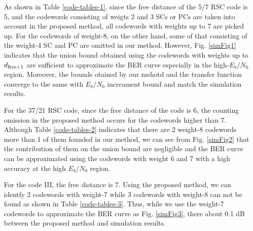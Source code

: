 As shown in Table \ref{code-tables-1}, since the free distance of the 5/7 RSC code is 5, and the codewords consisting of weigts 2 and 3 SCs or PCs are taken into account in the proposed method, all codewords with weights up to 7 are picked up. For the codewords of weight-8, on the other hand, some of that consisting of the weight-4 SC and PC are omitted in our method. However, Fig. \ref{simFig1} indicates that the union bound obtained using the codewords with weights up to $d_{\rm free+1}$ are sufficient to approximate the BER curve especially in the high-$E_b/N_0$ region. Moreover, the bounds otained by our mehotd and the transfer function converge to the same with $E_b/N_0$ increament bound and match the simulation results. 

For the 37/21 RSC code, since the free distance of the code is 6, the counting omission in the proposed method occurs for the codewords higher than 7. Although Table \ref{code-tables-2} indicates that there are 2 weight-8 codewords more than 1 of them founded in our method, we can see from Fig. \ref{simFig2} that the contribution of them on the union bound are negligible and the BER curve can be approximated using the codewords with weight 6 and 7 with a high accuracy at the high $E_b/N_0$ region.

For the code III, the free distance is 7. Using the proposed method, we can identfy 2 codewords with weight-7 while 3 codewords with weight-8 can not be found as shown in Table \ref{code-tables-3}. Thus, while we use the weight-7 codewords to approximate the BER curve as Fig. \ref{simFig3}, there about 0.1 dB between the proposed method and simulation results.

